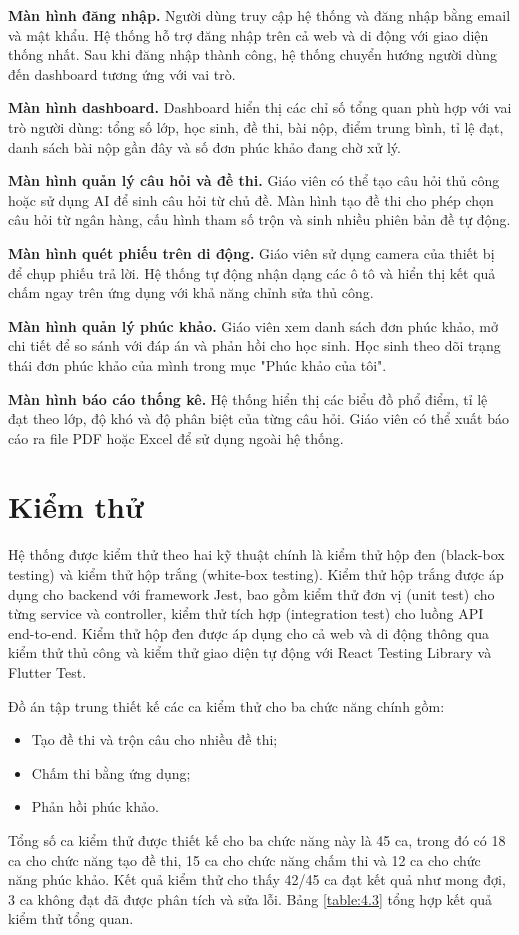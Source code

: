 ﻿\documentclass[../DoAn.tex]{subfiles}
\begin{document}
\noindent\textbf{Màn hình đăng nhập.} Người dùng truy cập hệ thống và đăng nhập bằng email và mật khẩu. Hệ thống hỗ trợ đăng nhập trên cả web và di động với giao diện thống nhất. Sau khi đăng nhập thành công, hệ thống chuyển hướng người dùng đến dashboard tương ứng với vai trò.

\noindent\textbf{Màn hình dashboard.} Dashboard hiển thị các chỉ số tổng quan phù hợp với vai trò người dùng: tổng số lớp, học sinh, đề thi, bài nộp, điểm trung bình, tỉ lệ đạt, danh sách bài nộp gần đây và số đơn phúc khảo đang chờ xử lý.

\noindent\textbf{Màn hình quản lý câu hỏi và đề thi.} Giáo viên có thể tạo câu hỏi thủ công hoặc sử dụng AI để sinh câu hỏi từ chủ đề. Màn hình tạo đề thi cho phép chọn câu hỏi từ ngân hàng, cấu hình tham số trộn và sinh nhiều phiên bản đề tự động.

\noindent\textbf{Màn hình quét phiếu trên di động.} Giáo viên sử dụng camera của thiết bị để chụp phiếu trả lời. Hệ thống tự động nhận dạng các ô tô và hiển thị kết quả chấm ngay trên ứng dụng với khả năng chỉnh sửa thủ công.

\noindent\textbf{Màn hình quản lý phúc khảo.} Giáo viên xem danh sách đơn phúc khảo, mở chi tiết để so sánh với đáp án và phản hồi cho học sinh. Học sinh theo dõi trạng thái đơn phúc khảo của mình trong mục "Phúc khảo của tôi".

\noindent\textbf{Màn hình báo cáo thống kê.} Hệ thống hiển thị các biểu đồ phổ điểm, tỉ lệ đạt theo lớp, độ khó và độ phân biệt của từng câu hỏi. Giáo viên có thể xuất báo cáo ra file PDF hoặc Excel để sử dụng ngoài hệ thống.

\section{Kiểm thử}
\label{section:4.4}

Hệ thống được kiểm thử theo hai kỹ thuật chính là kiểm thử hộp đen (black-box testing) và kiểm thử hộp trắng (white-box testing). Kiểm thử hộp trắng được áp dụng cho backend với framework Jest, bao gồm kiểm thử đơn vị (unit test) cho từng service và controller, kiểm thử tích hợp (integration test) cho luồng API end-to-end. Kiểm thử hộp đen được áp dụng cho cả web và di động thông qua kiểm thử thủ công và kiểm thử giao diện tự động với React Testing Library và Flutter Test.

Đồ án tập trung thiết kế các ca kiểm thử cho ba chức năng chính gồm:
\begin{itemize}
    \item Tạo đề thi và trộn câu cho nhiều đề thi;
    \item Chấm thi bằng ứng dụng;
    \item Phản hồi phúc khảo.
\end{itemize}
Tổng số ca kiểm thử được thiết kế cho ba chức năng này là 45 ca, trong đó có 18 ca cho chức năng tạo đề thi, 15 ca cho chức năng chấm thi và 12 ca cho chức năng phúc khảo. Kết quả kiểm thử cho thấy 42/45 ca đạt kết quả như mong đợi, 3 ca không đạt đã được phân tích và sửa lỗi. Bảng \ref{table:4.3} tổng hợp kết quả kiểm thử tổng quan.
\end{document}
